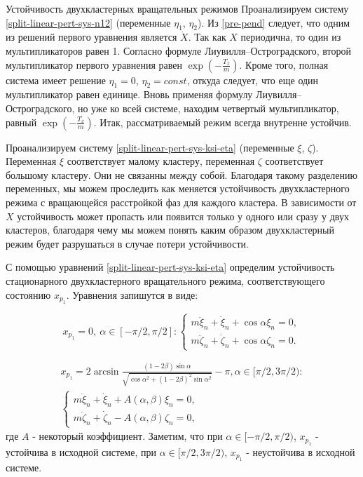 \begin{chapter}{Устойчивость двухкластерных вращательных режимов}
	Проанализируем систему \eqref{split-linear-pert-sys-n12} (переменные $\eta_1$, $\eta_2$).
	Из \eqref{pre-pend} следует, что одним из
	решений первого уравнения является $\dot{X}$.
	Так как $X$ периодична, то один из мультипликаторов равен 1.
	Согласно формуле Лиувилля--Остроградского, второй мультипликатор первого уравнения равен $\exp{(-\frac{T_x}{m})}$.
	Кроме того, полная система имеет решение $\eta_1 = 0$, $\eta_2 = const$,
	откуда следует, что еще один мультипликатор равен единице.
	Вновь применяя формулу Лиувилля--Остроградского, но
	уже ко всей системе, находим четвертый мультипликатор,
	равный $\exp{(-\frac{T_x}{m})}$. 
	Итак, рассматриваемый режим всегда внутренне устойчив.

	
	Проанализируем систему \eqref{split-linear-pert-sys-ksi-eta} (переменные $\xi$, $\zeta$).
	Переменная $\xi$ соответствует малому кластеру, переменная $\zeta$ соответствует большому кластеру. 
	Они не связанны между собой.
	Благодаря такому разделению переменных, мы можем проследить как меняется устойчивость
	двухкластерного режима с вращающейся расстройкой фаз для каждого кластера. В зависимости от $X$ устойчивость
	может пропасть или появится только у одного или сразу у двух кластеров, благодаря чему мы можем
	понять каким образом двухкластерный режим будет разрушаться в случае потери устойчивости.
	
	С помощью уравнений \eqref{split-linear-pert-sys-ksi-eta} определим устойчивость стационарного
	двухкластерного вращательного режима, соответствующего состоянию $x_{p_1}$.
	Уравнения запишутся в виде:
	
	\begin{equation}
		x_{p_1} = 0, \ \alpha \in [-\pi/ 2, \pi/2]: 
		\begin{cases}
			m\ddot{\xi}_n + \dot{\xi}_n + \cos{\alpha}\xi_n = 0, \\
			m\ddot{\zeta}_n + \dot{\zeta}_n + \cos{\alpha}\zeta_n = 0.
		\end{cases}
	\end{equation}
	
	\begin{equation}
		\begin{split}
			x_{p_1} = 2\arcsin{\frac{(1 - 2\beta) \sin{\alpha}}{\sqrt{\cos{\alpha}^2 + (1 - 2\beta)^2\sin{\alpha}^2}}} - \pi , \alpha \in [\pi/2, 3\pi/2): \\ 
			\begin{cases}
				m\ddot{\xi}_n + \dot{\xi}_n + A(\alpha, \beta) \xi_n = 0, \\
				m\ddot{\zeta}_n + \dot{\zeta}_n -A(\alpha, \beta) \zeta_n = 0,
			\end{cases}
		\end{split}
	\end{equation}
	где $A$ - некоторый коэффициент. Заметим, что при $\alpha \in [-\pi/ 2, \pi/2)$, $x_{p_1}$ - устойчива в исходной системе,
	при $\alpha \in [\pi/2, 3\pi/2)$, $x_{p_1}$ - неустойчива в исходной системе.


\end{chapter}
